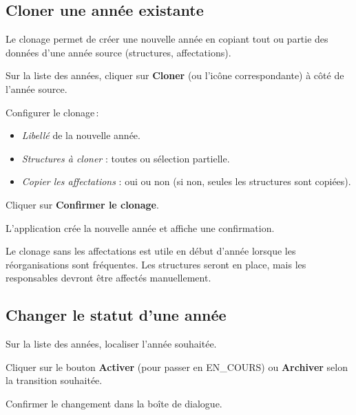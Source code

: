 \subsection{Cloner une ann\'ee existante}

Le clonage permet de cr\'eer une nouvelle ann\'ee en copiant tout ou partie des donn\'ees d'une ann\'ee source (structures, affectations).

\begin{steps}
  \item Sur la liste des ann\'ees, cliquer sur \textbf{Cloner} (ou l'ic\^one correspondante) \`a c\^ot\'e de l'ann\'ee source.
  \item Configurer le clonage\,:
    \begin{itemize}
      \item \textit{Libell\'e} de la nouvelle ann\'ee.
      \item \textit{Structures \`a cloner} : toutes ou s\'election partielle.
      \item \textit{Copier les affectations} : oui ou non (si non, seules les structures sont copi\'ees).
    \end{itemize}
  \item Cliquer sur \textbf{Confirmer le clonage}.
  \item L'application cr\'ee la nouvelle ann\'ee et affiche une confirmation.
\end{steps}


\begin{tipbox}
  Le clonage sans les affectations est utile en d\'ebut d'ann\'ee lorsque les r\'eorganisations sont fr\'equentes. Les structures seront en place, mais les responsables devront \^etre affect\'es manuellement.
\end{tipbox}

\subsection{Changer le statut d'une ann\'ee}

\begin{steps}
  \item Sur la liste des ann\'ees, localiser l'ann\'ee souhait\'ee.
  \item Cliquer sur le bouton \textbf{Activer} (pour passer en EN\_COURS) ou \textbf{Archiver} selon la transition souhait\'ee.
  \item Confirmer le changement dans la bo\^ite de dialogue.
\end{steps}

